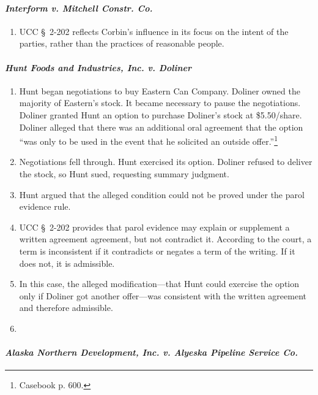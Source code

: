 \paragraph{\emph{Interform v. Mitchell Constr. Co.}}

\begin{enumerate}
    \item UCC \S\ 2-202 reflects Corbin's influence in its focus on the intent 
    of the parties, rather than the practices of reasonable people.
\end{enumerate}

\paragraph{\emph{Hunt Foods and Industries, Inc. v. Doliner}}

\begin{enumerate}
    \item Hunt began negotiations to buy Eastern Can Company. Doliner owned 
    the majority of Eastern's stock. It became necessary to pause the 
    negotiations. Doliner granted Hunt an option to purchase Doliner's stock 
    at \$5.50/share. Doliner alleged that there was an additional oral 
    agreement that the option ``was only to be used in the event that he 
    solicited an outside offer.''\footnote{Casebook p. 600.}
    \item Negotiations fell through. Hunt exercised its option. Doliner 
    refused to deliver the stock, so Hunt sued, requesting summary judgment.
    \item Hunt argued that the alleged condition could not be proved under the 
    parol evidence rule.
    \item UCC \S\ 2-202 provides that parol evidence may explain or supplement 
    a written agreement agreement, but not contradict it. According to the 
    court, a term is inconsistent if it contradicts or negates a term of the 
    writing. If it does not, it is admissible.
    \item In this case, the alleged modification---that Hunt could exercise 
    the option only if Doliner got another offer---was consistent with the 
    written agreement and therefore admissible.
    \item
\end{enumerate}

\paragraph{\emph{Alaska Northern Development, Inc. v. Alyeska Pipeline Service 
Co.}}

